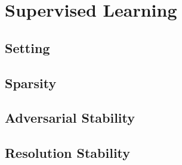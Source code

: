 \chapter{Supervised Learning}\label{ch:SL}
%
\section{Setting}
%
\section{Sparsity}
%
\section{Adversarial Stability}
%
\section{Resolution Stability}
%

